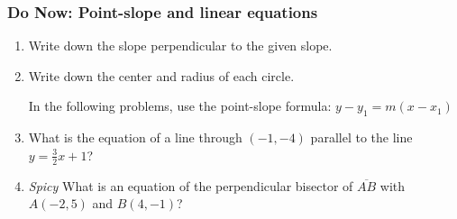 \documentclass[12pt, twoside]{article}
\begin{document}
\subsubsection*{Do Now: Point-slope and linear equations}
  \begin{enumerate}

  \item Write down the slope perpendicular to the given slope. \vspace{0.5cm}
    \begin{enumerate}
    \end{enumerate}

  \item Write down the center and radius of each circle.
    \begin{enumerate}
    \end{enumerate}  \vspace{2cm}

  In the following problems, use the point-slope formula: $y-y_1=m (x-x_1)$
    \item What is the equation of a line through $(-1,-4)$ parallel to the line $y=\frac{3}{2}x+1$?  \vspace{2cm}

    \item \emph{Spicy} What is an equation of the perpendicular bisector of $\overline{AB}$ with $A(-2,5)$ and $B(4,-1)$? \vspace{1cm}


  \end{enumerate}
\end{document}
